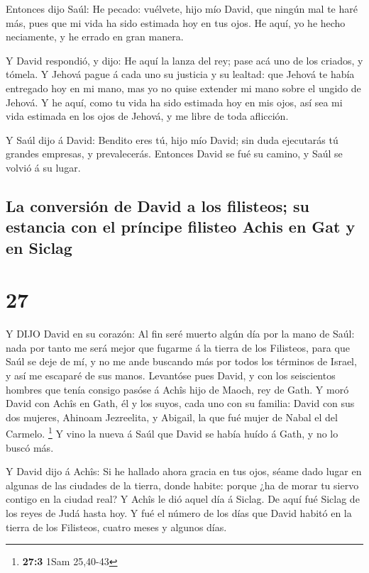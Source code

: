  Entonces dijo Saúl: He pecado: vuélvete, hijo mío David,
que ningún mal te haré más, pues que mi vida ha sido estimada hoy en tus
ojos. He aquí, yo he hecho neciamente, y he errado en gran manera.

 Y David respondió, y dijo: He aquí la lanza del rey; pase
acá uno de los criados, y tómela.  Y Jehová pague á cada
uno su justicia y su lealtad: que Jehová te había entregado hoy en mi
mano, mas yo no quise extender mi mano sobre el ungido de Jehová.
 Y he aquí, como tu vida ha sido estimada hoy en mis ojos,
así sea mi vida estimada en los ojos de Jehová, y me libre de toda
aflicción.

 Y Saúl dijo á David: Bendito eres tú, hijo mío David; sin
duda ejecutarás tú grandes empresas, y prevalecerás. Entonces David se
fué su camino, y Saúl se volvió á su lugar.

\hypertarget{la-conversiuxf3n-de-david-a-los-filisteos-su-estancia-con-el-pruxedncipe-filisteo-achis-en-gat-y-en-siclag}{%
\subsection{La conversión de David a los filisteos; su estancia con el
príncipe filisteo Achis en Gat y en
Siclag}\label{la-conversiuxf3n-de-david-a-los-filisteos-su-estancia-con-el-pruxedncipe-filisteo-achis-en-gat-y-en-siclag}}

\hypertarget{section-26}{%
\section{27}\label{section-26}}

 Y DIJO David en su corazón: Al fin seré muerto algún día
por la mano de Saúl: nada por tanto me será mejor que fugarme á la
tierra de los Filisteos, para que Saúl se deje de mí, y no me ande
buscando más por todos los términos de Israel, y así me escaparé de sus
manos.  Levantóse pues David, y con los seiscientos hombres
que tenía consigo pasóse á Achîs hijo de Maoch, rey de Gath.
 Y moró David con Achîs en Gath, él y los suyos, cada uno
con su familia: David con sus dos mujeres, Ahinoam Jezreelita, y
Abigail, la que fué mujer de Nabal el del Carmelo. \footnote{\textbf{27:3}
  1Sam 25,40-43}  Y vino la nueva á Saúl que David se había
huído á Gath, y no lo buscó más.

 Y David dijo á Achîs: Si he hallado ahora gracia en tus
ojos, séame dado lugar en algunas de las ciudades de la tierra, donde
habite: porque ¿ha de morar tu siervo contigo en la ciudad real?
 Y Achîs le dió aquel día á Siclag. De aquí fué Siclag de
los reyes de Judá hasta hoy.  Y fué el número de los días
que David habitó en la tierra de los Filisteos, cuatro meses y algunos
días.

